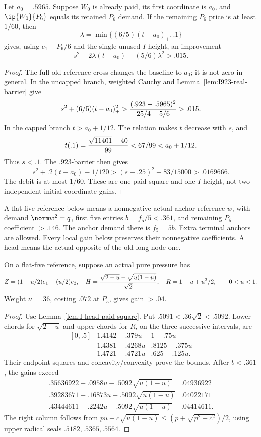 \begin{lemma}
\label{lem:I-capped-initial-graft}
Let \(a_0=.5965\). Suppose \(W_0\) is already paid, its first
coordinate is \(a_0\), and \(\ip{W_0}{P_6}\) equals its retained
\(P_6\) demand. If the remaining \(P_6\) price is at least \(1/60\),
then
\[
 \lambda=\min\{(6/5)(t-a_0)_+,.1\}
\]
gives, using \(e_1-P_6/6\) and the single unused \(I\)-height,
an improvement
\[
 s^2+2\lambda(t-a_0)-(5/6)\lambda^2>.015.
\]
\end{lemma}
\begin{proof}
The full old-reference cross changes the baseline to \(a_0\);
it is not zero in general. In the uncapped branch, weighted Cauchy
and Lemma~\ref{lem:I923-real-barrier} give
\[
 s^2+(6/5)(t-a_0)_+^2>
 {(.923-.5965)^2\over25/4+5/6}>.015.
\]
In the capped branch \(t>a_0+1/12\). The relation makes \(t\)
decrease with \(s\), and
\[
 t(.1)={\sqrt{11401}-40\over99}<67/99<a_0+1/12.
\]
Thus \(s<.1\). The \(.923\)-barrier then gives
\[
 s^2+.2(t-a_0)-1/120>
 (s-.25)^2-83/15000>.0169666.
\]
The debit is at most \(1/60\). These are one paid square and one
\(I\)-height, not two independent initial-coordinate gains.
\end{proof}

A flat-five reference below means a nonnegative actual-anchor reference
\(w\), with demand \(\norm w^2=q\), first five entries
\(b=f_5/5<.361\), and remaining \(P_5\) coefficient \(>.146\).
The anchor demand there is \(f_5=5b\). Extra terminal anchors are allowed.
Every local gain below preserves their nonnegative coefficients.
A head means the actual opposite of the old long node one.

\begin{lemma}
\label{lem:I-cleared-head-flat-gain}
On a flat-five reference, suppose an actual pure pressure has
\[
 Z=(1-u/2)e_1+(u/2)e_2,\quad
 H={\sqrt{2-u}-\sqrt{u(1-u)}\over\sqrt2},\quad
 R=1-u+u^2/2,\qquad 0<u<1.
\]
Weight \(\nu=.36\), costing \(.072\) at \(P_5\), gives gain \(>.04\).
\end{lemma}
\begin{proof}
Use Lemma~\ref{lem:I-head-paid-square}. Put
\(.5091<.36\sqrt2<.5092\). Lower chords for \(\sqrt{2-u}\)
and upper chords for \(R\), on the three successive intervals, are
\[
\begin{array}{c|c|c}
[0,.5]&1.4142-.379u&1-.75u\\
[.5,.75]&1.4381-.4268u&.8125-.375u\\
[.75,1]&1.4721-.4721u&.625-.125u.
\end{array}
\]
Their endpoint squares and concavity/convexity prove the bounds.
After \(b<.361\), the gains exceed
\[
\begin{array}{c|c}
.35636922-.0958u-.5092\sqrt{u(1-u)}&.04936922\\
.39283671-.16873u-.5092\sqrt{u(1-u)}&.04022171\\
.43444611-.2242u-.5092\sqrt{u(1-u)}&.04414611.
\end{array}
\]
The right column follows from
\(pu+c\sqrt{u(1-u)}\le(p+\sqrt{p^2+c^2})/2\),
using upper radical seals \(.5182,.5365,.5564\).
\end{proof}

